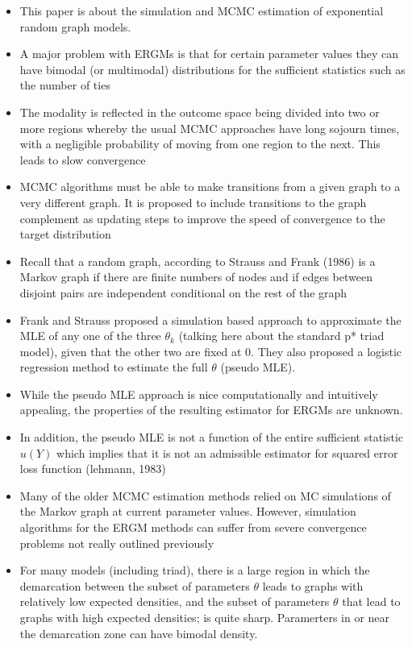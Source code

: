 \begin{itemize}
    \item This paper is about the simulation and MCMC estimation of exponential random graph models.
    \item A major problem with ERGMs is that for certain parameter values they can have bimodal (or multimodal) distributions for the sufficient statistics such as the number of ties
    \item The modality is reflected in the outcome space being divided into two or more regions whereby the usual MCMC approaches have long sojourn times, with a negligible probability of moving from one region to the next. This leads to slow convergence
    \item MCMC algorithms must be able to make transitions from a given graph to a very different graph. It is proposed to include transitions to the graph complement as updating steps to improve the speed of convergence to the target distribution
    \item Recall that a random graph, according to Strauss and Frank (1986) is a Markov graph if there are finite numbers of nodes and if edges between disjoint pairs are independent conditional on the rest of the graph
    \item Frank and Strauss proposed a simulation based approach to approximate the MLE of any one of the three $\theta_k$ (talking here about the standard p* triad model), given that the other two are fixed at 0. They also proposed a logistic regression method to estimate the full $\theta$ (pseudo MLE).
    \item While the pseudo MLE approach is nice computationally and intuitively appealing, the properties of the resulting estimator for ERGMs are unknown.
    \item In addition, the pseudo MLE is not a function of the entire sufficient statistic $u(Y)$ which implies that it is not an admissible estimator for squared error loss function (lehmann, 1983)
    \item Many of the older MCMC estimation methods relied on MC simulations of the Markov graph at current parameter values. However, simulation algorithms for the ERGM methods can suffer from severe convergence problems not really outlined previously
    \item For many models (including triad), there is a large region in which the demarcation between the subset of parameters $\theta$ leads to graphs with relatively low expected densities, and the subset of parameters $\theta$ that lead to graphs with high expected densities; is quite sharp. Paramerters in or near the demarcation zone can have bimodal density.

\end{itemize}
